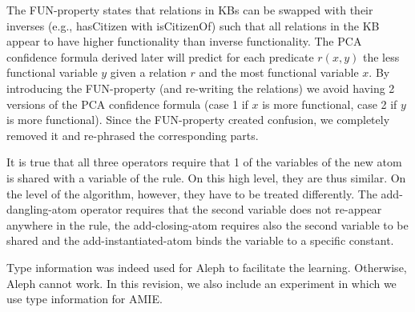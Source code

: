       The FUN-property states that relations in KBs can be swapped with their inverses (e.g., hasCitizen with isCitizenOf) such that all relations in the KB appear to have higher functionality
      than inverse functionality. The PCA confidence formula derived later will predict for each predicate $r(x,y)$ the less functional variable $y$ given a relation $r$ and the most functional variable $x$.
      By introducing the FUN-property (and re-writing the relations) we avoid having 2 versions of the PCA confidence formula (case 1 if $x$ is more functional, case 2 if $y$ is more functional).
      Since the FUN-property created confusion, we completely removed it and re-phrased the corresponding parts. 
      

It is true that all three operators require that 1 of the variables of the new atom is shared with a variable of the rule. On this high level, they are thus similar. On the level of the algorithm, however, they have to be treated differently. The add-dangling-atom operator requires that the second variable does not re-appear anywhere in the rule, the add-closing-atom requires also the second variable to be shared and the add-instantiated-atom binds the variable to a specific constant.
      

      Type information was indeed used for Aleph to facilitate the learning. Otherwise, Aleph cannot work. 
      In this revision, we also include an experiment in which we use type information for AMIE. 
      
      
     
